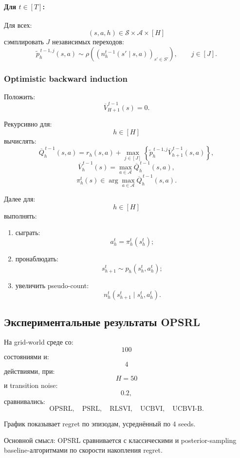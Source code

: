 \documentclass[12pt,a4paper]{article}
\begin{document}
\paragraph{Для $t\in[T]$:}

Для всех:
\[
(s,a,h)\in\mathcal S\times\mathcal A\times[H]
\]
сэмплировать $J$ независимых переходов:
\[
\widetilde p_{h}^{\,t-1,j}(s,a)
\sim
\rho
\left(
\left(
n_h^{t-1}(s'\mid s,a)
\right)_{s'\in S'}
\right),
\qquad
j\in[J].
\]

\subsubsection{Optimistic backward induction}

Положить:
\[
\overline V_{H+1}^{\,t-1}(s)=0.
\]

Рекурсивно для:
\[
h\in[H]
\]
вычислять:
\[
\overline Q_h^{\,t-1}(s,a)
=
r_h(s,a)
+
\max_{j\in[J]}
\left\{
\widetilde p_h^{\,t-1,j}
\overline V_{h+1}^{\,t-1}(s,a)
\right\},
\]
\[
\overline V_h^{\,t-1}(s)
=
\max_{a\in\mathcal A}
\overline Q_h^{\,t-1}(s,a),
\]
\[
\pi_h^t(s)
\in
\arg\max_{a\in\mathcal A}
\overline Q_h^{\,t-1}(s,a).
\]

Далее для:
\[
h\in[H]
\]
выполнять:

\begin{enumerate}
    \item сыграть:
    \[
    a_h^t
    =
    \pi_h^t(s_h^t);
    \]

    \item пронаблюдать:
    \[
    s_{h+1}^t
    \sim
    p_h(s_h^t,a_h^t);
    \]

    \item увеличить pseudo-count:
    \[
    n_h^t(s_{h+1}^t\mid s_h^t,a_h^t).
    \]
\end{enumerate}

\subsection{Экспериментальные результаты OPSRL}

На grid-world среде со:
\[
100
\]
состояниями и:
\[
4
\]
действиями, при:
\[
H=50
\]
и transition noise:
\[
0.2,
\]
сравнивались:
\[
\text{OPSRL},\quad
\text{PSRL},\quad
\text{RLSVI},\quad
\text{UCBVI},\quad
\text{UCBVI-B}.
\]

График показывает regret по эпизодам, усреднённый по 4 seeds.

Основной смысл: OPSRL сравнивается с классическими и posterior-sampling baseline-алгоритмами по скорости накопления regret.
\end{document}
